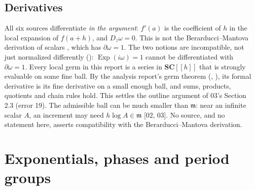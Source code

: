 \documentclass[11pt,a4paper]{article}
\numberwithin{equation}{section}
\theoremstyle{definition}
\theoremstyle{remark}
\newcommand{\SC}{\mathbf{SC}}
\newcommand{\mm}{\mathfrak m}
\newcommand{\Exp}{\operatorname{Exp}}
\newcommand{\src}[1]{\textup{[#1]}}
\begin{document}
\subsection{Derivatives}\label{gz:sec:derivatives}
All six sources differentiate \emph{in the argument}: $f'(a)$ is the
coefficient of $h$ in the local expansion of $f(a+h)$, and $D_z\omega=0$.
This is not the Berarducci--Mantova derivation of scalars \cite{BMder},
which has $\partial\omega=1$. The two notions are incompatible, not just
normalized differently (): $\Exp(i\omega)=1$
cannot be differentiated with $\partial\omega=1$. Every local germ in this
report is a series in $\SC[[h]]$ that is strongly evaluable on some fine
ball. By the analysis report's germ theorem (,
), its formal derivative is its fine derivative on a
small enough ball, and sums, products, quotients and chain rules hold.
This settles the outline argument of 03's Section 2.3 (error 19). The
admissible ball can be much smaller than $\mm$: near an infinite scalar
$A$, an increment may need $h\log A\in\mm$ \src{02, 03}. No source, and no
statement here, asserts compatibility with the Berarducci--Mantova
derivation.

\section{Exponentials, phases and period groups}\label{gz:sec:phases}
\end{document}
